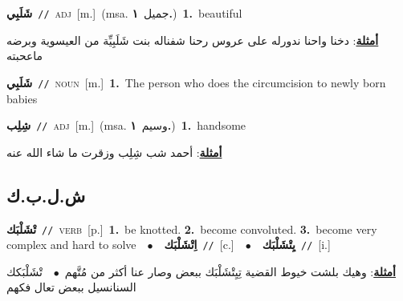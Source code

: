 \documentclass[10pt,a4paper,twoside]{article} %
\begin{document}
\begin{multicols}{2}
{\setlength\topsep{0pt}\textbf{\foreignlanguage{arabic}{شَلَبِي}}\ {\color{gray}\texttt{//}\color{black}}\ \textsc{adj}\ [m.]\ \color{gray}(msa. \foreignlanguage{arabic}{جميل}~\foreignlanguage{arabic}{\textbf{١.}})\color{black}\ \textbf{1.}~beautiful\  \begin{flushright}\color{gray}\foreignlanguage{arabic}{\textbf{\underline{\foreignlanguage{arabic}{أمثلة}}}: دخنا واحنا ندورله على عروس رحنا شفناله بنت شَلَبِيِّة من العيسوية وبرضه ماعحبته}\end{flushright}\color{black}} \vspace{2mm}

{\setlength\topsep{0pt}\textbf{\foreignlanguage{arabic}{شَلَبِي}}\ {\color{gray}\texttt{//}\color{black}}\ \textsc{noun}\ [m.]\ \textbf{1.}~The person who does the circumcision to newly born babies\ } \vspace{2mm}

{\setlength\topsep{0pt}\textbf{\foreignlanguage{arabic}{شِلِب}}\ {\color{gray}\texttt{//}\color{black}}\ \textsc{adj}\ [m.]\ \color{gray}(msa. \foreignlanguage{arabic}{وسيم}~\foreignlanguage{arabic}{\textbf{١.}})\color{black}\ \textbf{1.}~handsome\  \begin{flushright}\color{gray}\foreignlanguage{arabic}{\textbf{\underline{\foreignlanguage{arabic}{أمثلة}}}: أحمد شب شِلِب وزقرت ما شاء الله عنه}\end{flushright}\color{black}} \vspace{2mm}

\vspace{-3mm}
\subsection*{\color{blue}\foreignlanguage{arabic}{ش.ل.ب.ك}\color{blue}{}} 

{\setlength\topsep{0pt}\textbf{\foreignlanguage{arabic}{تْشَلْبَك}}\ {\color{gray}\texttt{//}\color{black}}\ \textsc{verb}\ [p.]\ \textbf{1.}~be knotted.  \textbf{2.}~become convoluted.  \textbf{3.}~become very complex and hard to solve\ \ $\bullet$\ \ \setlength\topsep{0pt}\textbf{\foreignlanguage{arabic}{اِتْشَلْبَك}}\ {\color{gray}\texttt{//}\color{black}}\ [c.]\ \ $\bullet$\ \ \setlength\topsep{0pt}\textbf{\foreignlanguage{arabic}{يِتْشَلْبَك}}\ {\color{gray}\texttt{//}\color{black}}\ [i.]\  \begin{flushright}\color{gray}\foreignlanguage{arabic}{\textbf{\underline{\foreignlanguage{arabic}{أمثلة}}}: وهيك بلشت خيوط القضية تِيِتْشَلْبَك ببعض وصار عنا أكثر من مُتَّهم\ $\bullet$\ \  تْشَلْبَكك السنانسيل ببعض تعال فكهم}\end{flushright}\color{black}} \vspace{2mm}


\end{multicols}
\end{document}
